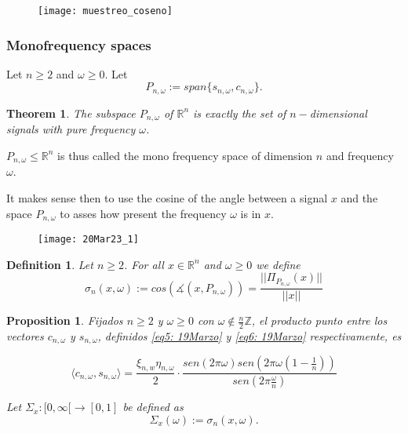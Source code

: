 \documentclass[]{beamer}
\newtheorem{teo}{\bf Theorem}
\newtheorem{prop}{\bf Proposition}
\newtheorem{defi}{\bf Definition}
\theoremstyle{definition}
\newcommand{\IR}{\mathbb{R}}
\newcommand{\IZ}{\mathbb{Z}}
\begin{document}
\begin{frame}
\begin{figure}[h]
\texttt{[image: muestreo\_coseno]}
\end{figure}
\end{frame}

\begin{frame}
\frametitle{Monofrequency spaces}
Let $n \geq 2$ and $\omega \geq 0$. Let
\[
P_{n, \omega} := span \{ s_{n, \omega}, c_{n, \omega} \}.
\]

\begin{teo}
The subspace $P_{n, \omega}$ of $\IR^{n}$ is exactly the
set of $n-$dimensional signals with pure frequency $\omega$.
\end{teo}
$P_{n, \omega} \leq \IR^{n}$ is thus called the mono frequency space of 
dimension $n$ and frequency $\omega$.
\end{frame}

\begin{frame}
It makes sense then to use the cosine of the angle between
a signal $x$ and the space $P_{n, \omega}$ to asses how
present the frequency $\omega$ is in $x$.
\begin{figure}[h]
\texttt{[image: 20Mar23\_1]}
\end{figure}
\end{frame}

\begin{frame}
\begin{defi}
\label{def: taus}
Let $n \geq 2$. For all $x \in \IR^{n}$ and $\omega \geq 0$
we define
	\[
	\sigma_{n}(x, \omega) := cos(\measuredangle(x, P_{n, \omega}))
	= \frac{|| \Pi_{P_{n, \omega}}(x) ||}{||x||}
	\]
\end{defi}
\end{frame}

\begin{frame}
\begin{prop}
\label{prop: producto punto entre f y g}
Fijados $n \geq 2$ y $\omega \geq 0$ con 
$\omega \not\in \frac{n}{2}\IZ$, 
el producto punto entre 
los vectores
$c_{n, \omega}$ y $s_{n, \omega}$, definidos 
\eqref{eq5: 19Marzo} y \eqref{eq6: 19Marzo}
respectivamente, es

\begin{equation}
\label{eq9: 19Marzo}
\langle c_{n, \omega} , s_{n, \omega} \rangle =
\frac{\xi_{n, w} \eta_{n, \omega}}{2} \cdot 
\frac{sen(2 \pi \omega)
sen(2 \pi \omega \left( 1- \frac{1}{n} \right))}{sen \left(2 \pi 
\frac{\omega}{n} \right)}
\end{equation}

Let $\Sigma_{x}: [0, \infty[ \longrightarrow [0,1]$
be defined
as \[
\Sigma_{x}(\omega) := \sigma_{n}(x, \omega).
\]

\end{prop}
\end{frame}
\end{document}
